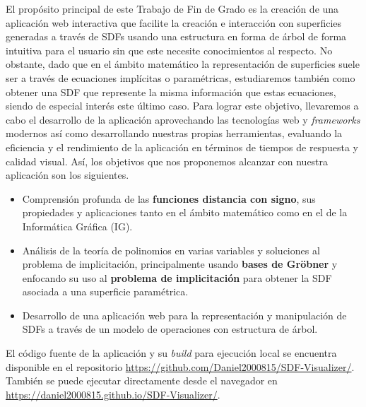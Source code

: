 El propósito principal de este Trabajo de Fin de Grado es la creación de una aplicación web interactiva que facilite la creación e interacción con superficies generadas a través de SDFs usando una estructura en forma de árbol de forma intuitiva para el usuario sin que este necesite conocimientos al respecto. No obstante, dado que en el ámbito matemático la representación de superficies suele ser a través de ecuaciones implícitas o paramétricas, estudiaremos también como obtener una SDF que represente la misma información que estas ecuaciones, siendo de especial interés este último caso. Para lograr este objetivo, llevaremos a cabo el desarrollo de la aplicación aprovechando las tecnologías web y \textit{frameworks} modernos así como desarrollando nuestras propias herramientas, evaluando la eficiencia y el rendimiento de la aplicación en términos de tiempos de respuesta y calidad visual. Así, los objetivos que nos proponemos alcanzar con nuestra aplicación son los siguientes.\newline
\begin{itemize}
    \item Comprensión profunda de las \textbf{funciones distancia con signo}, sus propiedades y aplicaciones tanto en el ámbito matemático como en el de la Informática Gráfica (IG).
    \item Análisis de la teoría de polinomios en varias variables y soluciones al problema de implicitación, principalmente usando \textbf{bases de Gröbner} y enfocando su uso al \textbf{problema de implicitación} para obtener la SDF asociada a una superficie paramétrica.
    \item Desarrollo de una aplicación web para la representación y manipulación de SDFs a través de un modelo de operaciones con estructura de árbol.
\end{itemize}

El código fuente de la aplicación y su \textit{build} para ejecución local se encuentra disponible en el repositorio \href{https://github.com/Daniel2000815/SDF-Visualizer/}{https://github.com/Daniel2000815/SDF-Visualizer/}. También se puede ejecutar directamente desde el navegador en \href{https://daniel2000815.github.io/SDF-Visualizer/}{https://daniel2000815.github.io/SDF-Visualizer/}.

